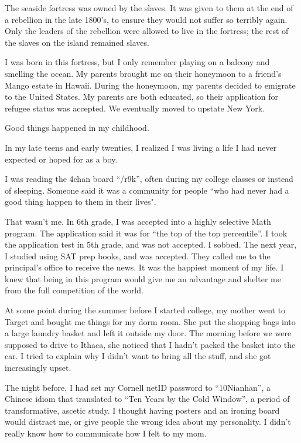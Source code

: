 \ledsection{}

The seaside fortress was owned by the slaves.  It was given to them at the end
of a rebellion in the late 1800's, to ensure they would not suffer so terribly
again.  Only the leaders of the rebellion were allowed to live in the fortress;
the rest of the slaves on the island remained slaves. 

I was born in this fortress, but I only remember playing on a balcony and
smelling the ocean.  My parents brought me on their honeymoon to a friend's
Mango estate in Hawaii.  During the honeymoon, my parents decided to emigrate to
the United States.  My parents are both educated, so their application for
refugee status was accepted.  We eventually moved to upstate New York.

Good things happened in my childhood.  

In my late teens and early twenties, I realized I was living a life I had never
expected or hoped for as a boy.  

I was reading the 4chan board ``/r9k'', often during my college classes or
instead of sleeping.  Someone said it was a community for people ``who had never
had a good thing happen to them in their lives".  

That wasn't me.  In 6th grade, I was accepted into a highly selective Math
program.  The application said it was for ``the top of the top percentile''.  I
took the application test in 5th grade, and was not accepted.  I sobbed.  The
next year, I studied using SAT prep books, and was accepted.  They called me to
the principal's office to receive the news.  It was the happiest moment of my
life.  I knew that being in this program would give me an advantage and shelter
me from the full competition of the world.

At some point during the summer before I started college, my mother went to
Target and bought me things for my dorm room.  She put the shopping bags into a
large laundry basket and left it outside my door.  The morning before we were
supposed to drive to Ithaca, she noticed that I hadn't packed the basket into
the car.  I tried to explain why I didn't want to bring all the stuff, and she
got increasingly upset.

The night before, I had set my Cornell netID password to ``10Nianhan'', a
Chinese idiom that translated to ``Ten Years by the Cold Window'', a period of
transformative, ascetic study.  I thought having posters and an ironing board
would distract me, or give people the wrong idea about my personality.  I didn't
really know how to communicate how I felt to my mom.

